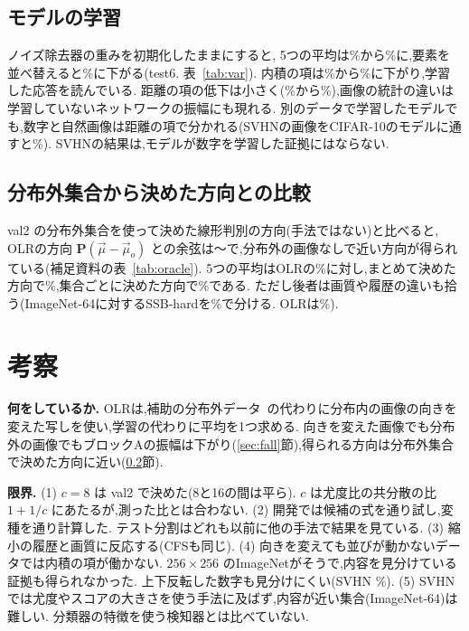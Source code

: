 \documentclass[MIRU,submit]{miru2025j}
\newcommand{\Ours}{OLR}   %
\newcommand{\Pm}{\mathbf{P}}\newcommand{\Gm}{\mathbf{G}}\newcommand{\vd}{\vec{\delta}}\newcommand{\vmu}{\vec{\mu}}\newcommand{\va}{\vec{a}}\newcommand{\Sm}{\mathbf{S}}\newcommand{\Id}{\mathbf{I}}
\begin{document}
\subsection{モデルの学習}
\label{sec:model}
ノイズ除去器の重みを初期化したままにすると, 5つの平均は\olVarTrained\%から\olVarRinit\%に,要素を並べ替えると\olVarRshuf\%に下がる(test6. 表~\ref{tab:var}). 内積の項は\olVarTrainedL\%から\olVarRinitL\%に下がり,学習した応答を読んでいる. 距離の項の低下は小さく(\olVarTrainedT\%から\olVarRinitT\%),画像の統計の違いは学習していないネットワークの振幅にも現れる. 別のデータで学習したモデルでも,数字と自然画像は距離の項で分かれる(SVHNの画像をCIFAR-10のモデルに通すと\olVarByMax\%). SVHNの結果は,モデルが数字を学習した証拠にはならない.

\subsection{分布外集合から決めた方向との比較}
\label{sec:oracle}
val2 の分布外集合を使って決めた線形判別の方向(手法ではない)と比べると, \Ours{}の方向 $\Pm(\vmu-\vmu_{o})$ との余弦は\olCosMin{}〜\olCosMax{}で,分布外の画像なしで近い方向が得られている(補足資料の表~\ref{tab:oracle}). 5つの平均は\Ours{}の\olXOLR\%に対し,まとめて決めた方向で\olXPool\%,集合ごとに決めた方向で\olXSet\%である. ただし後者は画質や履歴の違いも拾う(ImageNet-64に対するSSB-hardを\olXSsbSet\%で分ける. \Ours{}は\olXSsbOLR\%).

\section{考察}
\label{sec:disc}
\textbf{何をしているか.} \Ours{}は,補助の分布外データ~\cite{hendrycks2019oe}の代わりに分布内の画像の向きを変えた写しを使い,学習の代わりに平均を1つ求める. 向きを変えた画像でも分布外の画像でもブロックAの振幅は下がり(\ref{sec:fall}節),得られる方向は分布外集合で決めた方向に近い(\ref{sec:oracle}節).

\textbf{限界.} (1) $c=8$ は val2 で決めた(8と16の間は平ら). $c$ は尤度比の共分散の比 $1+1/c$ にあたるが,測った比とは合わない. (2) 開発では候補の式を\olNDev{}通り試し,変種を\olNVar{}通り計算した. テスト分割はどれも以前に他の手法で結果を見ている. (3) 縮小の履歴と画質に反応する(CFSも同じ). (4) 向きを変えても並びが動かないデータでは内積の項が働かない. $256{\times}256$ のImageNetがそうで,内容を見分けている証拠も得られなかった. 上下反転した数字も見分けにくい(SVHN \olSixVfSVHN\%). (5) SVHNでは尤度やスコアの大きさを使う手法に及ばず,内容が近い集合(ImageNet-64)は難しい. 分類器の特徴を使う検知器とは比べていない.
\end{document}
